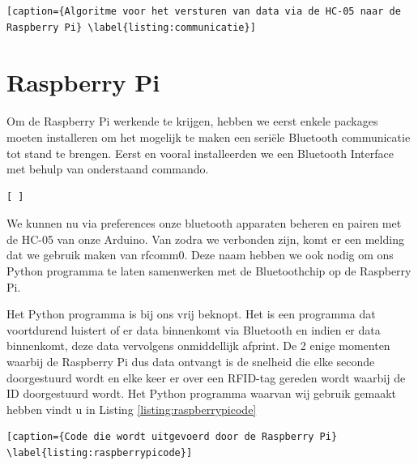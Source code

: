 
\begin{lstlisting}[caption={Algoritme voor het versturen van data via de HC-05 naar de Raspberry Pi} \label{listing:communicatie}]
\end{lstlisting}

\section{Raspberry Pi}


Om de Raspberry Pi werkende te krijgen, hebben we eerst enkele packages moeten installeren om het mogelijk te maken een seri\"ele Bluetooth communicatie tot stand te brengen. Eerst en vooral installeerden we een Bluetooth Interface met behulp van onderstaand commando.


\begin{lstlisting}[ ]
\end{lstlisting}

We kunnen nu via preferences onze bluetooth apparaten beheren en pairen met de HC-05 van onze Arduino. Van zodra we verbonden zijn, komt er een melding dat we gebruik maken van rfcomm0. Deze naam hebben we ook nodig om ons Python programma te laten samenwerken met de Bluetoothchip op de Raspberry Pi. 

Het Python programma is bij ons vrij beknopt. Het is een programma dat voortdurend luistert of er data binnenkomt via Bluetooth en indien er data binnenkomt, deze data vervolgens onmiddellijk afprint. De 2 enige momenten waarbij de Raspberry Pi dus data ontvangt is de snelheid die elke seconde doorgestuurd wordt en elke keer er over een RFID-tag gereden wordt waarbij de ID doorgestuurd wordt. Het Python programma waarvan wij gebruik gemaakt hebben vindt u in Listing \ref{listing:raspberrypicode}



\begin{lstlisting}[caption={Code die wordt uitgevoerd door de Raspberry Pi} \label{listing:raspberrypicode}]
\end{lstlisting}



